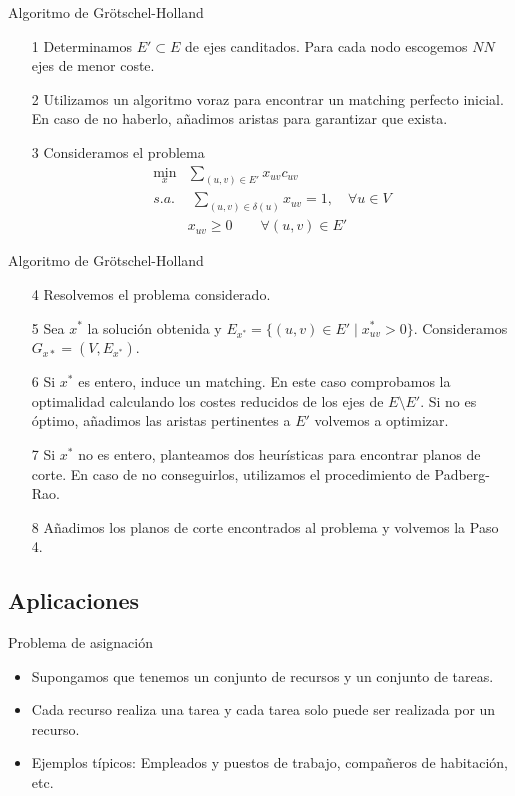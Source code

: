 \documentclass{beamer}
\begin{document}
\begin{frame}{Algoritmo de Grötschel-Holland}
\begin{enumerate}
\item[1] Determinamos $E'\subset E$ de ejes canditados. Para cada nodo escogemos $NN$ ejes de menor coste. 
\item[2] Utilizamos un algoritmo voraz para encontrar un matching perfecto inicial. En caso de no haberlo, añadimos aristas para garantizar que exista.
\item[3] Consideramos el problema
\begin{align*}
\min_x & \sum_{(u,v) \in E'}x_{uv}c_{uv}\\
s.a.&\;\sum_{(u,v)\in\delta(u)} x_{uv} = 1, \quad \forall u \in V\\
&x_{uv} \geq 0 \qquad \forall(u,v)\in E'
\end{align*}
\end{enumerate}
\end{frame}

\begin{frame}{Algoritmo de Grötschel-Holland}
\begin{enumerate}
\item[4] Resolvemos el problema considerado. 
\item [5] Sea $x^*$ la solución obtenida y $E_{x^*} = \{(u,v)\in E' \mid x^*_{uv}>0\}$. Consideramos  $G_{x*} = (V,E_{x^*})$.
\item[6] Si $x^*$ es entero, induce un matching. En este caso comprobamos la optimalidad calculando los costes reducidos de los ejes de $E\setminus E'$. Si no es óptimo, añadimos las aristas pertinentes a $E'$ volvemos a optimizar.
\item[7] Si $x^*$ no es entero, planteamos dos heurísticas para encontrar planos de corte. En caso de no conseguirlos, utilizamos el procedimiento de Padberg-Rao.
\item[8] Añadimos los planos de corte encontrados al problema y volvemos la Paso 4.
\end{enumerate}
\end{frame}
\subsection{Aplicaciones}
\begin{frame}{Problema de asignación}
\begin{itemize}
\item Supongamos que tenemos un conjunto de recursos y un conjunto de tareas.
\item Cada recurso realiza una tarea y cada tarea solo puede ser realizada por un recurso.
\item Ejemplos típicos: Empleados y puestos de trabajo, compañeros de habitación, etc.
\end{itemize}
\end{frame}
\end{document}
